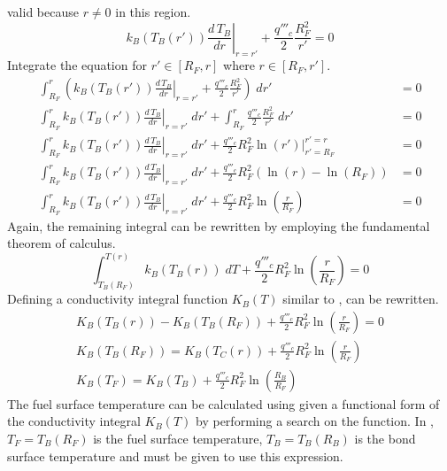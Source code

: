       valid because $r \ne 0$ in this region.
      \begin{equation}
        \left. k_B(T_B(r')) \frac{d\,T_B}{dr} \right|_{r=r'} + 
          \frac{q'''_c}{2} \frac{R_F^2}{r'} = 0
      \end{equation}
      Integrate the equation for $r' \in [R_F,r]$ where $r \in [R_F,r']$.
      \begin{align}
        \int_{R_F}^r \left( \left. k_B(T_B(r')) \frac{d\,T_B}{dr}\right|_{r=r'}
          + \frac{q'''_c}{2} \frac{R_F^2}{r'} \right) \; dr' &= 0 \\
        \int_{R_F}^r \left. k_B(T_B(r')) \frac{d\,T_B}{dr}\right|_{r=r'} \; dr'
          + \int_{R_F}^r \frac{q'''_c}{2} \frac{R_F^2}{r'} \; dr' &= 0\\
        \int_{R_F}^r \left. k_B(T_B(r')) \frac{d\,T_B}{dr}\right|_{r=r'} \; dr'
          + \frac{q'''_c}{2} R_F^2 \left. \ln(r') \right|_{r'=R_F}^{r'=r} &= 0\\
        \int_{R_F}^r \left. k_B(T_B(r')) \frac{d\,T_B}{dr}\right|_{r=r'} \; dr'
          + \frac{q'''_c}{2} R_F^2 ( \ln(r) - \ln(R_F)) &= 0 \\
        \int_{R_F}^r \left. k_B(T_B(r')) \frac{d\,T_B}{dr}\right|_{r=r'} \; dr'
          + \frac{q'''_c}{2} R_F^2 \ln\left(\frac{r}{R_F}\right) &= 0 
      \end{align}
      Again, the remaining integral can be rewritten by employing the
      fundamental theorem of calculus.
      \begin{equation}
        \label{eq:tf_fundamental_theorem}
        \int_{T_B(R_F)}^{T(r)} k_B(T_B(r)) \; dT + \frac{q'''_c}{2} R_F^2 
          \ln\left(\frac{r}{R_F}\right) = 0
      \end{equation}
      Defining a conductivity integral function $K_B(T)$ similar to
      ,  can be
      rewritten.
      \begin{gather}
        K_B(T_B(r)) - K_B(T_B(R_F)) + \frac{q'''_c}{2} R_F^2
          \ln\left(\frac{r}{R_F}\right) = 0 \\
        K_B(T_B(R_F)) = K_B(T_C(r)) + \frac{q'''_c}{2} R_F^2
          \ln\left(\frac{r}{R_F}\right) \\
        \label{eq:tf_conductivity_integral}
        K_B(T_F) = K_B(T_B) + \frac{q'''_c}{2} R_F^2
          \ln\left(\frac{R_B}{R_F}\right)
      \end{gather}
      The fuel surface temperature can be calculated using
       given a functional form of the
      conductivity integral $K_B(T)$ by performing a search on the function. In
      , $T_F=T_B(R_F)$ is the fuel surface 
      temperature, $T_B=T_B(R_B)$ is the bond surface temperature and must be
      given to use this expression.

